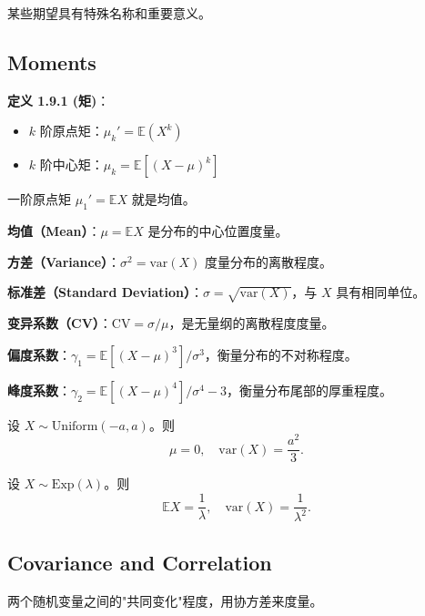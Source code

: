 某些期望具有特殊名称和重要意义。

\subsection{Moments}

\begin{remark}
\textbf{定义 1.9.1 (矩)}：
\begin{itemize}
    \item $k$ 阶原点矩：$\mu_k' = \mathbb{E}(X^k)$
    \item $k$ 阶中心矩：$\mu_k = \mathbb{E}[(X - \mu)^k]$
\end{itemize}

一阶原点矩 $\mu_1' = \mathbb{E}X$ 就是均值。
\end{remark}

\textbf{均值（Mean）}：$\mu = \mathbb{E}X$ 是分布的中心位置度量。

\textbf{方差（Variance）}：$\sigma^2 = \text{var}(X)$ 度量分布的离散程度。

\textbf{标准差（Standard Deviation）}：$\sigma = \sqrt{\text{var}(X)}$，与 $X$ 具有相同单位。

\textbf{变异系数（CV）}：$\text{CV} = \sigma/\mu$，是无量纲的离散程度度量。

\textbf{偏度系数}：$\gamma_1 = \mathbb{E}[(X-\mu)^3]/\sigma^3$，衡量分布的不对称程度。

\textbf{峰度系数}：$\gamma_2 = \mathbb{E}[(X-\mu)^4]/\sigma^4 - 3$，衡量分布尾部的厚重程度。

\begin{example}[均匀分布的矩]\label{ex:uniform-moments-ch1}
设 $X \sim \text{Uniform}(-a, a)$。则
\[
\mu = 0, \quad \text{var}(X) = \frac{a^2}{3}.
\]
\end{example}

\begin{example}[指数分布的矩]\label{ex:exponential-moments-ch1}
设 $X \sim \text{Exp}(\lambda)$。则
\[
\mathbb{E}X = \frac{1}{\lambda}, \quad \text{var}(X) = \frac{1}{\lambda^2}.
\]
\end{example}

\subsection{Covariance and Correlation}

两个随机变量之间的"共同变化"程度，用协方差来度量。

